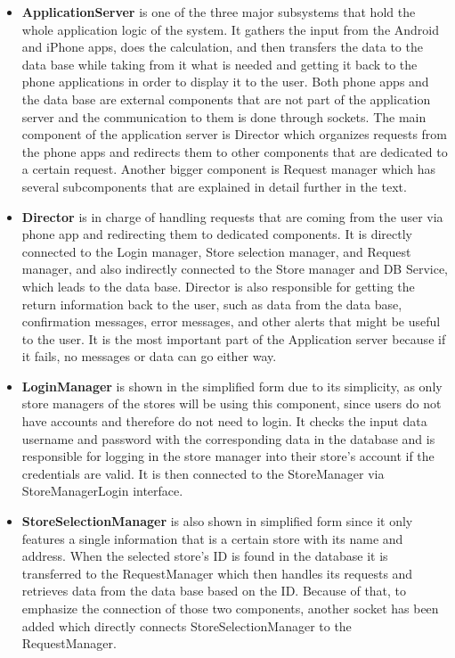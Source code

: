 \begin{itemize}
\item \textbf{ApplicationServer} is one of the three major subsystems that hold the whole application logic of the system. It gathers the input from the Android and iPhone apps, does the calculation, and then transfers the data to the data base while taking from it what is needed and getting it back to the phone applications in order to display it to the user. Both phone apps and the data base are external components that are not part of the application server and the communication to them is done through sockets. The main component of the application server is Director which organizes requests from the phone apps and redirects them to other components that are dedicated to a certain request. Another bigger component is Request manager which has several subcomponents that are explained in detail further in the text.  

\item \textbf{Director} is in charge of handling requests that are coming from the user via phone app and redirecting them to dedicated components. It is directly connected to the Login manager, Store selection manager, and Request manager, and also indirectly connected to the Store manager and DB Service, which leads to the data base. Director is also responsible for getting the return information back to the user, such as data from the data base, confirmation messages, error messages, and other alerts that might be useful to the user. It is the most important part of the Application server because if it fails, no messages or data can go either way.  

\item \textbf{LoginManager} is shown in the simplified form due to its simplicity, as only store managers of the stores will be using this component, since users do not have accounts and therefore do not need to login. It checks the input data username and password with the corresponding data in the database and is responsible for logging in the store manager into their store's account if the credentials are valid. It is then connected to the StoreManager via StoreManagerLogin interface. 

\item \textbf{StoreSelectionManager} is also shown in simplified form since it only features a single information that is a certain store with its name and address. When the selected store's ID is found in the database it is transferred to the RequestManager which then handles its requests and retrieves data from the data base based on the ID. Because of that, to emphasize the connection of those two components, another socket has been added which directly connects StoreSelectionManager to the RequestManager.  


\end{itemize}
